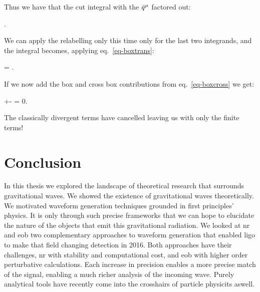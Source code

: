 \documentclass[
  11pt,
  a4paper,
  DIV=11,
  numbers=noendperiod,
  twoside]{scrreprt}
\let\[\relax \let\]\relax %
\DeclareRobustCommand{\[}{\begin{equation}}
\DeclareRobustCommand{\]}{\end{equation}}
\begin{document}
Thus we have that the cut integral with the \(\bar{q}_{}{}^{\mu}\) factored out:

\[
\int \dn[4]{\bar{\ell}}\Half{} .
\]

We can apply the relabelling only this time only for the last two
integrands, and the integral becomes, applying eq.~\ref{eq-boxtrans}:

\[
\int \dn[4]{\bar{\ell}}\Half{}= \int \dn[4]{\bar{\ell}}  .
\]

If we now add the box and cross box contributions from
eq.~\ref{eq-boxcross} we get:

\[
\int \dn[4]{\bar{\ell}}+-  =  0.
\]

The classically divergent terms have cancelled leaving us with only the
finite terms!


\hypertarget{sec-conclusion}{%
\chapter{Conclusion}\label{sec-conclusion}}

In this thesis we explored the landscape of theoretical research that
surrounds gravitational waves. We showed the existence of gravitational
waves theoretically. We motivated waveform generation techniques
grounded in first principles' physics. It is only through such precise
frameworks that we can hope to elucidate the nature of the objects that
emit this gravitational radiation. We looked at \gls{nr} and \gls{eob}
two complementary approaches to waveform generation that enabled
\gls{ligo} to make that field changing detection in 2016. Both
approaches have their challenges, \gls{nr} with stability and
computational cost, and \gls{eob} with higher order perturbative
calculations. Each increase in precision enables a more precise match of
the signal, enabling a much richer analysis of the incoming wave. Purely
analytical tools have recently come into the crosshairs of particle
physicits aswell.
\end{document}
